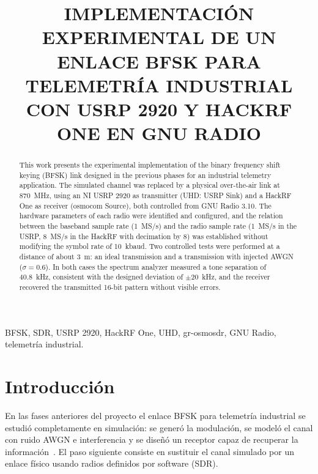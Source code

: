 \documentclass[conference]{IEEEtran}
\begin{document}
\title{IMPLEMENTACIÓN EXPERIMENTAL DE UN ENLACE BFSK PARA TELEMETRÍA INDUSTRIAL CON USRP 2920 Y HACKRF ONE EN GNU RADIO}

\author{
}

\maketitle

\begin{abstract}
This work presents the experimental implementation of the binary frequency shift keying (BFSK) link designed in the previous phases for an industrial telemetry application. The simulated channel was replaced by a physical over-the-air link at 870~MHz, using an NI USRP 2920 as transmitter (UHD: USRP Sink) and a HackRF One as receiver (osmocom Source), both controlled from GNU Radio 3.10. The hardware parameters of each radio were identified and configured, and the relation between the baseband sample rate (1~MS/s) and the radio sample rate (1~MS/s in the USRP, 8~MS/s in the HackRF with decimation by 8) was established without modifying the symbol rate of 10~kbaud. Two controlled tests were performed at a distance of about 3~m: an ideal transmission and a transmission with injected AWGN ($\sigma = 0.6$). In both cases the spectrum analyzer measured a tone separation of 40.8~kHz, consistent with the designed deviation of $\pm 20$~kHz, and the receiver recovered the transmitted 16-bit pattern without visible errors.
\end{abstract}

\begin{IEEEkeywords}
BFSK, SDR, USRP 2920, HackRF One, UHD, gr-osmosdr, GNU Radio, telemetría industrial.
\end{IEEEkeywords}

\section{Introducción}

En las fases anteriores del proyecto el enlace BFSK para telemetría industrial se estudió completamente en simulación: se generó la modulación, se modeló el canal con ruido AWGN e interferencia y se diseñó un receptor capaz de recuperar la información~\cite{guia1,guia2}. El paso siguiente consiste en sustituir el canal simulado por un enlace físico usando radios definidos por software (SDR).
\end{document}
